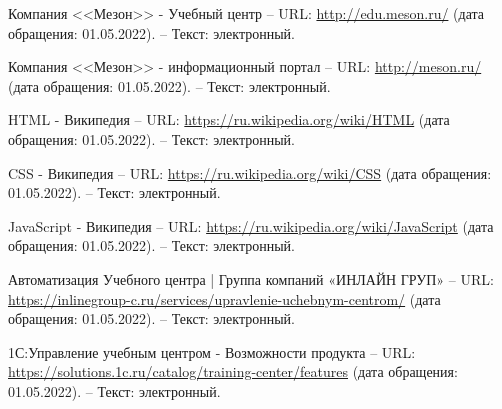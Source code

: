 \begingroup
\renewcommand{\section}[2]{\anonsection{Список использованных источников}}
\begin{thebibliography}{00}


    

        Компания <<Мезон>> - Учебный центр
        --
        URL:
        \href{http://edu.meson.ru/}{http://edu.meson.ru/}
        (дата обращения: 01.05.2022).
        --
        Текст: электронный.

        Компания <<Мезон>> - информационный портал
        --
        URL:
        \href{http://meson.ru/}{http://meson.ru/}
        (дата обращения: 01.05.2022).
        --
        Текст: электронный.

        HTML - Википедия 
        --
        URL:
        \href{https://ru.wikipedia.org/wiki/HTML}{https://ru.wikipedia.org/wiki/HTML}
        (дата обращения: 01.05.2022).
        --
        Текст: электронный.

        CSS - Википедия 
        --
        URL:
        \href{https://ru.wikipedia.org/wiki/CSS}{https://ru.wikipedia.org/wiki/CSS}
        (дата обращения: 01.05.2022).
        --
        Текст: электронный.
    
        JavaScript - Википедия 
        --
        URL:
        \href{https://ru.wikipedia.org/wiki/JavaScript}{https://ru.wikipedia.org/wiki/JavaScript}
        (дата обращения: 01.05.2022).
        --
        Текст: электронный.

        Автоматизация Учебного центра | Группа компаний «ИНЛАЙН ГРУП»
        --
        URL:
        \href{https://inlinegroup-c.ru/services/upravlenie-uchebnym-centrom/}{https://inlinegroup-c.ru/services/upravlenie-uchebnym-centrom/}
        (дата обращения: 01.05.2022).
        --
        Текст: электронный.

        1С:Управление учебным центром - Возможности продукта
        --
        URL:
        \href{https://solutions.1c.ru/catalog/training-center/features}{https://solutions.1c.ru/catalog/training-center/features}
        (дата обращения: 01.05.2022).
        --
        Текст: электронный.


\end{thebibliography}
